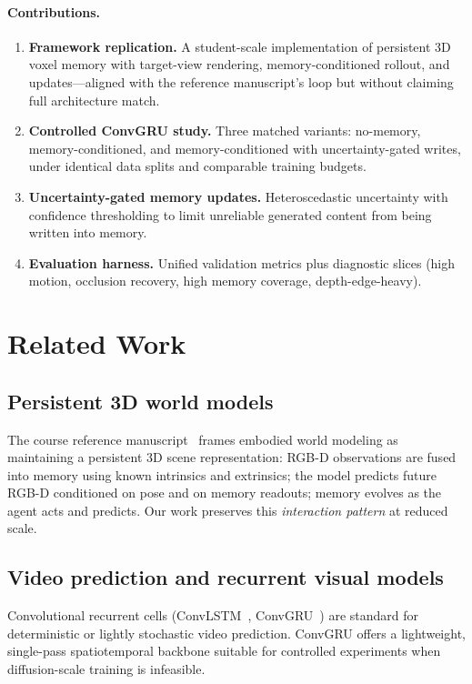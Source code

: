 \documentclass[11pt]{article}
\begin{document}
\paragraph{Contributions.}
\begin{enumerate}[leftmargin=1.5em,itemsep=2pt]
  \item \textbf{Framework replication.} A student-scale implementation of persistent 3D voxel memory with
        target-view rendering, memory-conditioned rollout, and updates---aligned with the reference
        manuscript's loop but without claiming full architecture match.
  \item \textbf{Controlled ConvGRU study.} Three matched variants: no-memory, memory-conditioned, and
        memory-conditioned with uncertainty-gated writes, under identical data splits and comparable training
        budgets.
  \item \textbf{Uncertainty-gated memory updates.} Heteroscedastic uncertainty with confidence thresholding
        to limit unreliable generated content from being written into memory.
  \item \textbf{Evaluation harness.} Unified validation metrics plus diagnostic slices (high motion,
        occlusion recovery, high memory coverage, depth-edge-heavy).
\end{enumerate}

\section{Related Work}

\subsection{Persistent 3D world models}
The course reference manuscript~\cite{persistent3dworld} frames embodied world modeling as maintaining a
persistent 3D scene representation: RGB-D observations are fused into memory using known intrinsics and
extrinsics; the model predicts future RGB-D conditioned on pose and on memory readouts; memory evolves as
the agent acts and predicts. Our work preserves this \emph{interaction pattern} at reduced scale.

\subsection{Video prediction and recurrent visual models}
Convolutional recurrent cells (ConvLSTM~\cite{convlstm}, ConvGRU~\cite{convgru}) are standard for
deterministic or lightly stochastic video prediction. ConvGRU offers a lightweight, single-pass
spatiotemporal backbone suitable for controlled experiments when diffusion-scale training is infeasible.
\end{document}
